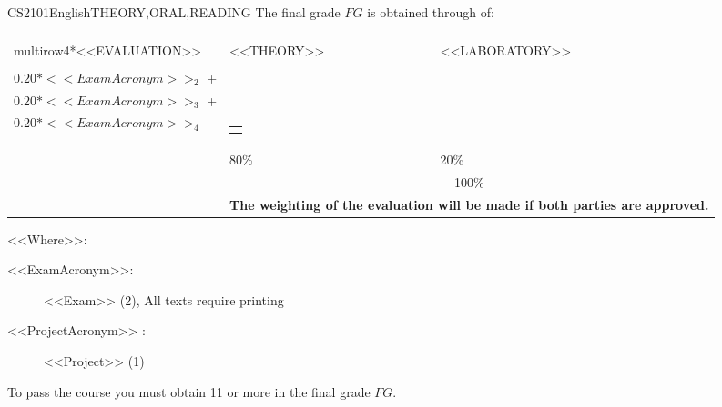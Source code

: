   \begin{evaluation}{CS2101}{English}{THEORY,ORAL,READING}
  The final grade $FG$ is obtained through of:

  \begin{tabularx}{0.9\textwidth}{|X|p{}|p{}|} \hline
    \\multirow{4}{*}{\uppercase{<<Evaluation>>}} & \uppercase{<<Theory>>} & \uppercase{<<Laboratory>>} \\ \cline{2-3}
    & %
        \begin{minipage}{0.95\textwidth}
        \begin{tabular}{l}
            $0.20* <<ExamAcronym>>_{1}$ + \\  
            $0.20* <<ExamAcronym>>_{2}$ + \\ 
            $0.20* <<ExamAcronym>>_{3}$ + \\  
            $0.20* <<ExamAcronym>>_{4}$
        \end{tabular} 
        \end{minipage} 
    & %
        \begin{minipage}{0.95\textwidth}
        \begin{tabular}{l}
            $0.20*<<ProjectAcronym>>_{1}$
            \end{tabular} 
        \end{minipage}                 \\ \cline{2-3}
    
    & %
    80\% 
    & %
    20\% \\ \cline{2-3}
    & \multicolumn{2}{c|}{100\%}  \\ \cline{2-3}
    & \multicolumn{2}{c|}{\textbf{The weighting of the evaluation will be made if both parties are approved.}}  \\ \hline
    \end{tabularx}
    
    \vspace{2mm}
    \noindent <<Where>>:
    \begin{description}
        \item[<<ExamAcronym>>:] <<Exam>> (2), All texts require printing
        \item[<<ProjectAcronym>> :] <<Project>> (1)
    \end{description}
  \noindent To pass the course you must obtain 11 or more in the final grade $FG$.
  \end{evaluation}


